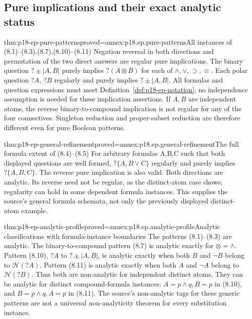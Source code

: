 \subsection{Pure implications and their exact analytic status}

\begin{hbtheorem}{thm:p18-ep-pure-patterns}{proved=annex:p18.ep.pure-patterns}{All instances of (8.1)--(8.3),(8.7),(8.10)--(8.11)}
Negation reversal in both directions and permutation of the two direct
answers are regular pure implications. The binary question
\(?\pm|A,B|\) purely implies \(?(A\otimes B)\) for each of
\(\land,\lor,\supset,\equiv\). Each polar question \(?A\), \(?B\)
regularly and purely implies \(?\pm|A,B|\).
All formulas and question expressions must meet
Definition~\ref{def:p18-ep-notation}; no independence assumption is needed
for these implication assertions. If \(A,B\) are independent atoms,
the reverse binary-to-compound implication is not regular for any of the
four connectives. Singleton reduction and proper-subset reduction are
therefore different even for pure Boolean patterns.
\end{hbtheorem}

\begin{hbtheorem}{thm:p18-ep-general-refinement}{proved=annex:p18.ep.general-refinement}{The full formula extent of (8.4)--(8.5)}
For arbitrary formulas A,B,C such that both displayed questions are well
formed, \(?\{A,B\lor C\}\) regularly and purely implies
\(?\{A,B,C\}\). The reverse pure implication is also valid.
Both directions are analytic. Its reverse need not be regular, as the
distinct-atom case shows; regularity can hold in some dependent formula
instances. This supplies the source's general formula schemata, not only
the previously displayed distinct-atom example.
\end{hbtheorem}

\begin{hbtheorem}{thm:p18-ep-analytic-profile}{proved=annex:p18.ep.analytic-profile}{Analytic classifications with formula-instance boundaries}
The patterns (8.1)--(8.3) are analytic. The binary-to-compound pattern
(8.7) is analytic exactly for \(\otimes=\land\).
Pattern (8.10), \(?A\) to \(?\pm|A,B|\), is analytic exactly when
both \(B\) and \(\neg B\) belong to \(\mathcal H(?A)\).
Pattern (8.11) is analytic exactly when both \(A\) and \(\neg A\)
belong to \(\mathcal H(?B)\).
Thus both are non-analytic for independent distinct atoms. They can be
analytic for distinct compound-formula instances: \(A=p\land q,B=p\)
in (8.10), and \(B=p\land q,A=p\) in (8.11).
The source's non-analytic tags for these generic patterns are not a
universal non-analyticity theorem for every substitution instance.
\end{hbtheorem}

